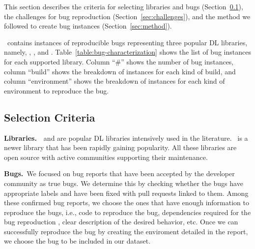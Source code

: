 \documentclass[sigconf,screen]{acmart}
\begin{document}
This section describes the criteria for selecting libraries and bugs
(Section~\ref{sec:selection-criterion}), the challenges for bug
reproduction (Section~\ref{sec:challenges}), and the method we
followed to create bug instances (Section~\ref{sec:method}).

\tname\ contains \numbugs{} instances of reproducible bugs
representing three popular DL libraries, namely, \jax, \tf, and
\torch. Table~\ref{table:bug-characterization} shows the list of bug
instances for each supported library. Column ``\#'' shows the number
of bug instances, column ``build'' shows the breakdown of instances
for each kind of build, and column ``environment'' shows the breakdown
of instances for each kind of environment to reproduce the bug.

\subsection{Selection Criteria}
\label{sec:selection-criterion}


\textbf{Libraries.}~\torch~and \tf are popular DL libraries
intensively used in the literature. \jax\ is a newer library that has
been rapidly gaining popularity. All these libraries are open source
with active communities supporting their maintenance.




\textbf{Bugs.}~We focused on bug reports that have been accepted by
the developer community as true bugs. We determine this by checking
whether the bugs have appropriate labels and have been fixed with pull
requests linked to them. Among these confirmed bug reports, we choose
the ones that have enough information to reproduce the bugs, i.e.,
code to reproduce the bug, dependencies required for the bug
reproduction
, clear description of the desired behavior,
etc. Once we can successfully reproduce the bug by creating the
enviroment detailed in the report, we choose the bug to be included in
our dataset.
\end{document}
